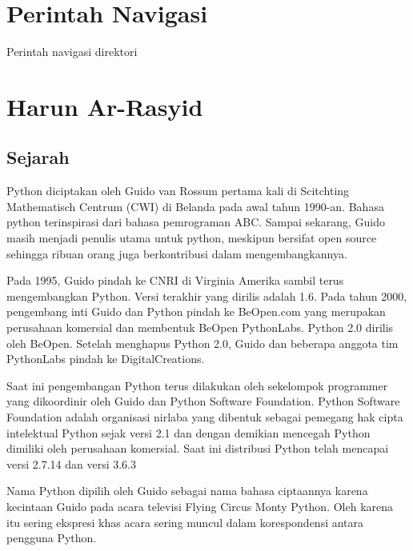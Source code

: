 \section{Perintah Navigasi}
Perintah navigasi direktori

\section{Harun Ar-Rasyid}
\subsection{Sejarah}
Python diciptakan oleh Guido van Rossum pertama kali di Scitchting Mathematisch Centrum (CWI) di Belanda pada awal tahun 1990-an. Bahasa python terinspirasi dari bahasa pemrograman ABC. Sampai sekarang, Guido masih menjadi penulis utama untuk python, meskipun bersifat open source sehingga ribuan orang juga berkontribusi dalam mengembangkannya.

Pada 1995, Guido pindah ke CNRI di Virginia Amerika sambil terus mengembangkan Python. Versi terakhir yang dirilis adalah 1.6. Pada tahun 2000, pengembang inti Guido dan Python pindah ke BeOpen.com yang merupakan perusahaan komersial dan membentuk BeOpen PythonLabs. Python 2.0 dirilis oleh BeOpen. Setelah menghapus Python 2.0, Guido dan beberapa anggota tim PythonLabs pindah ke DigitalCreations.

Saat ini pengembangan Python terus dilakukan oleh sekelompok programmer yang dikoordinir oleh Guido dan Python Software Foundation. Python Software Foundation adalah organisasi nirlaba yang dibentuk sebagai pemegang hak cipta intelektual Python sejak versi 2.1 dan dengan demikian mencegah Python dimiliki oleh perusahaan komersial. Saat ini distribusi Python telah mencapai versi 2.7.14 dan versi 3.6.3

Nama Python dipilih oleh Guido sebagai nama bahasa ciptaannya karena kecintaan Guido pada acara televisi Flying Circus Monty Python. Oleh karena itu sering ekspresi khas acara sering muncul dalam korespondensi antara pengguna Python.
